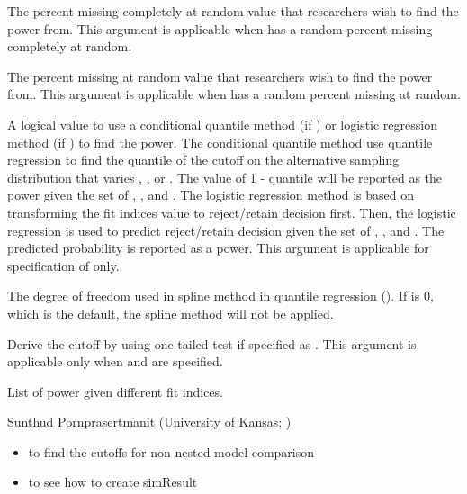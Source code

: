 \documentclass[a4paper]{book}
\begin{document}
\begin{Arguments}
\begin{ldescription}
\item[\code{pmMCARval}] 
The percent missing completely at random value that researchers wish to find the power from. This argument is applicable when  has a random percent missing completely at random. 

\item[\code{pmMARval}] 
The percent missing at random value that researchers wish to find the power from. This argument is applicable when  has a random percent missing at random. 

\item[\code{condCutoff}] 
A logical value to use a conditional quantile method (if ) or logistic regression method (if ) to find the power. The conditional quantile method use quantile regression to find the quantile of the cutoff on the alternative sampling distribution that varies , , or . The value of 1 - quantile will be reported as the power given the set of , , and . The logistic regression method is based on transforming the fit indices value to reject/retain decision first. Then, the logistic regression is used to predict reject/retain decision given the set of , , and . The predicted probability is reported as a power. This argument is applicable for specification of  only.

\item[\code{df}] 
The degree of freedom used in spline method in quantile regression (). If  is 0, which is the default, the spline method will not be applied.

\item[\code{onetailed}] 
Derive the cutoff by using one-tailed test if specified as . This argument is applicable only when  and  are specified.

\end{ldescription}
\end{Arguments}
%
\begin{Value}
List of power given different fit indices.
\end{Value}
%
\begin{Author}\relax
Sunthud Pornprasertmanit (University of Kansas; )
\end{Author}
%
\begin{SeeAlso}\relax
\begin{itemize}

\item {} to find the cutoffs for non-nested model comparison
\item {} to see how to create simResult

\end{itemize}

\end{SeeAlso}
\end{document}
